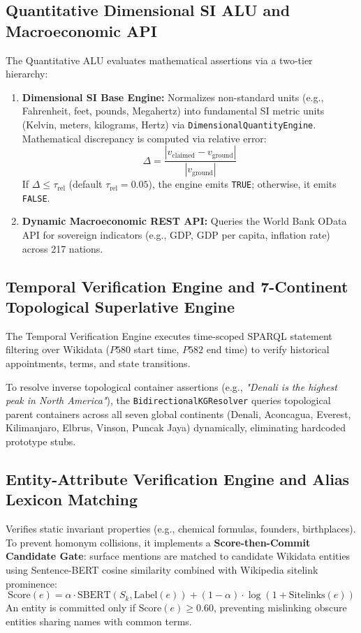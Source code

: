 \subsection{Quantitative Dimensional SI ALU and Macroeconomic API}
The Quantitative ALU evaluates mathematical assertions via a two-tier hierarchy:
\begin{enumerate}
    \item \textbf{Dimensional SI Base Engine:} Normalizes non-standard units (e.g., Fahrenheit, feet, pounds, Megahertz) into fundamental SI metric units (Kelvin, meters, kilograms, Hertz) via \texttt{DimensionalQuantityEngine}. Mathematical discrepancy is computed via relative error:
    \begin{equation}
        \Delta = \frac{|v_{\text{claimed}} - v_{\text{ground}}|}{|v_{\text{ground}}|}
    \end{equation}
    If $\Delta \le \tau_{\text{rel}}$ (default $\tau_{\text{rel}} = 0.05$), the engine emits \texttt{TRUE}; otherwise, it emits \texttt{FALSE}.
    \item \textbf{Dynamic Macroeconomic REST API:} Queries the World Bank OData API for sovereign indicators (e.g., GDP, GDP per capita, inflation rate) across 217 nations.
\end{enumerate}

\subsection{Temporal Verification Engine and 7-Continent Topological Superlative Engine}
The Temporal Verification Engine executes time-scoped SPARQL statement filtering over Wikidata ($P580$ start time, $P582$ end time) to verify historical appointments, terms, and state transitions.

To resolve inverse topological container assertions (e.g., \textit{"Denali is the highest peak in North America"}), the \texttt{BidirectionalKGResolver} queries topological parent containers across all seven global continents (Denali, Aconcagua, Everest, Kilimanjaro, Elbrus, Vinson, Puncak Jaya) dynamically, eliminating hardcoded prototype stubs.

\subsection{Entity-Attribute Verification Engine and Alias Lexicon Matching}
Verifies static invariant properties (e.g., chemical formulas, founders, birthplaces). To prevent homonym collisions, it implements a \textbf{Score-then-Commit Candidate Gate}: surface mentions are matched to candidate Wikidata entities using Sentence-BERT cosine similarity combined with Wikipedia sitelink prominence:
\begin{equation}
    \text{Score}(e) = \alpha \cdot \text{SBERT}(S_k, \text{Label}(e)) + (1-\alpha) \cdot \log(1 + \text{Sitelinks}(e))
\end{equation}
An entity is committed only if $\text{Score}(e) \ge 0.60$, preventing mislinking obscure entities sharing names with common terms.

